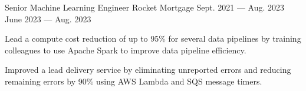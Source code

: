 
\vspace{-0.1cm}
\begin{cventries}
  \cventry
    {Senior Machine Learning Engineer} %
    {Rocket Mortgage} %
    {Sept. 2021 --- Aug. 2023} %
    {June 2023 --- Aug. 2023} %
    {
      \vspace{-0.1cm}
      \begin{cvitems} %
        \item Lead a compute cost reduction of up to 95\% for several data pipelines by training colleagues to use Apache Spark to improve data pipeline efficiency.
        \item Improved a lead delivery service by eliminating unreported errors and reducing remaining errors by 90\% using AWS Lambda and SQS message timers.
      \end{cvitems}
    }
  \vspace{-.2cm}


\end{cventries}
